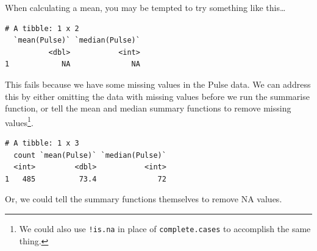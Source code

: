\documentclass[
]{book}
\newenvironment{Shaded}{\begin{snugshade}}{\end{snugshade}}
\newcommand{\DataTypeTok}[1]{\textcolor[rgb]{0.13,0.29,0.53}{#1}}
\newcommand{\KeywordTok}[1]{\textcolor[rgb]{0.13,0.29,0.53}{\textbf{#1}}}
\newcommand{\NormalTok}[1]{#1}
\newcommand{\OperatorTok}[1]{\textcolor[rgb]{0.81,0.36,0.00}{\textbf{#1}}}
\newcommand{\OtherTok}[1]{\textcolor[rgb]{0.56,0.35,0.01}{#1}}
\newcommand{\StringTok}[1]{\textcolor[rgb]{0.31,0.60,0.02}{#1}}
\begin{document}
When calculating a mean, you may be tempted to try something like this\ldots{}

\begin{Shaded}
\end{Shaded}

\begin{verbatim}
# A tibble: 1 x 2
  `mean(Pulse)` `median(Pulse)`
          <dbl>           <int>
1            NA              NA
\end{verbatim}

This fails because we have some missing values in the Pulse data. We can address this by either omitting the data with missing values before we run the summarise function, or tell the mean and median summary functions to remove missing values\footnote{We could also use \texttt{!is.na} in place of \texttt{complete.cases} to accomplish the same thing.}.

\begin{Shaded}
\end{Shaded}

\begin{verbatim}
# A tibble: 1 x 3
  count `mean(Pulse)` `median(Pulse)`
  <int>         <dbl>           <int>
1   485          73.4              72
\end{verbatim}

Or, we could tell the summary functions themselves to remove NA values.

\begin{Shaded}
\end{Shaded}
\end{document}
